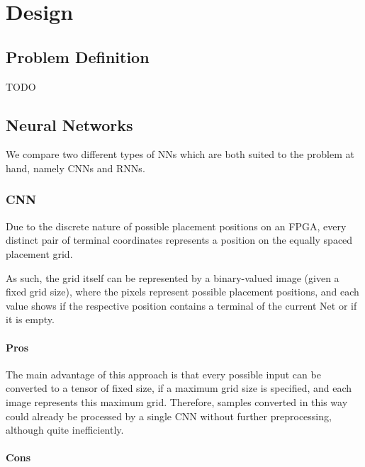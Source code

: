 
\chapter{Design}\label{ch:design}
\glsresetall %

\section{Problem Definition}

TODO

\section{Neural Networks}

We compare two different types of \glspl{NN} which are both suited to the problem at hand, namely \glspl{CNN} and \glspl{RNN}.

\subsection{\gls{CNN}}

Due to the discrete nature of possible placement positions on an \gls{FPGA}, every distinct pair of terminal coordinates represents a position on the equally spaced placement grid. 

As such, the grid itself can be represented by a binary-valued image (given a fixed grid size), where the pixels represent possible placement positions, and each value shows if the respective position contains a terminal of the current Net or if it is empty.

\subsubsection{Pros}

The main advantage of this approach is that every possible input can be converted to a tensor of fixed size, if a maximum grid size is specified, and each image represents this maximum grid. Therefore, samples converted in this way could already be processed by a single \gls{CNN} without further preprocessing, although quite inefficiently.

\subsubsection{Cons}

